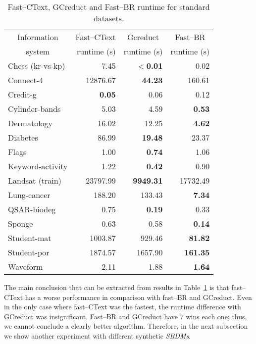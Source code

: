 \documentclass[authoryear,11pt]{elsarticle}
\begin{document}
\begin{table}[!htb]
	\centering
	\caption{Fast--CText, GCreduct and Fast--BR runtime for standard datasets.}
	\label{tab:java}
	\begin{tabular}{|l|r|r|r|}
		\hline
		\multicolumn{1}{|c|}{Information}  & Fast--CText & \multicolumn{1}{c|}{Gcreduct} & \multicolumn{1}{c|}{Fast--BR}  \\
		\multicolumn{1}{|c|}{system}       & runtime (s) & runtime (s)  & runtime (s)  \\
		\hline
		Chess (kr-vs-kp)          & 7.45          & \textbf{$<$0.01} & 0.02            \\
		Connect-4                 & 12876.67      & \textbf{44.23}   & 160.61          \\
		Credit-g                  & \textbf{0.05} & 0.06             & 0.12            \\
		Cylinder-bands            & 5.03          & 4.59             & \textbf{0.53}   \\
		Dermatology               & 16.02         & 12.25            & \textbf{4.62}   \\
		Diabetes                  & 86.99         & \textbf{19.48}   & 23.37           \\
		Flags                     & 1.00          & \textbf{0.74}    & 1.06            \\
		Keyword-activity          & 1.22          & \textbf{0.42}    & 0.90            \\
		Landsat (train)           & 23797.99      & \textbf{9949.31} & 17732.49        \\
		Lung-cancer               & 188.20        & 133.43           & \textbf{7.34}   \\
		QSAR-biodeg               & 0.75          & \textbf{0.19}    & 0.33            \\
		Sponge                    & 0.63          & 0.58             & \textbf{0.14}   \\
		Student-mat               & 1003.87       & 929.46           & \textbf{81.82}  \\
		Student-por               & 1874.57       & 1657.90          & \textbf{161.35} \\
		Waveform                  & 2.11          & 1.88             & \textbf{1.64}   \\
		\hline
	\end{tabular}
\end{table}

  The main conclusion that can be extracted from results in Table~\ref{tab:java} is that fast--CText has a worse performance in comparison with fast--BR and GCreduct. Even in the only case where fast--CText was the fastest, the runtime difference with GCreduct was insignificant. Fast--BR and GCreduct have 7 wins each one; thus, we cannot conclude a clearly better algorithm. Therefore, in the next subsection we show another experiment with different synthetic \textit{SBDMs}.
\end{document}

